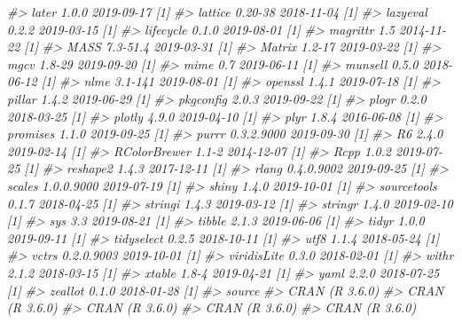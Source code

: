 \documentclass[
  12pt,
]{krantz}
\newenvironment{Shaded}{\begin{snugshade}}{\end{snugshade}}
\newcommand{\CommentTok}[1]{\textcolor[rgb]{0.56,0.35,0.01}{\textit{#1}}}
\begin{document}
\begin{Shaded}
\begin{Highlighting}[]
\CommentTok{#>  later          1.0.0      2019-09-17 [1]}
\CommentTok{#>  lattice        0.20-38    2018-11-04 [1]}
\CommentTok{#>  lazyeval       0.2.2      2019-03-15 [1]}
\CommentTok{#>  lifecycle      0.1.0      2019-08-01 [1]}
\CommentTok{#>  magrittr       1.5        2014-11-22 [1]}
\CommentTok{#>  MASS           7.3-51.4   2019-03-31 [1]}
\CommentTok{#>  Matrix         1.2-17     2019-03-22 [1]}
\CommentTok{#>  mgcv           1.8-29     2019-09-20 [1]}
\CommentTok{#>  mime           0.7        2019-06-11 [1]}
\CommentTok{#>  munsell        0.5.0      2018-06-12 [1]}
\CommentTok{#>  nlme           3.1-141    2019-08-01 [1]}
\CommentTok{#>  openssl        1.4.1      2019-07-18 [1]}
\CommentTok{#>  pillar         1.4.2      2019-06-29 [1]}
\CommentTok{#>  pkgconfig      2.0.3      2019-09-22 [1]}
\CommentTok{#>  plogr          0.2.0      2018-03-25 [1]}
\CommentTok{#>  plotly         4.9.0      2019-04-10 [1]}
\CommentTok{#>  plyr           1.8.4      2016-06-08 [1]}
\CommentTok{#>  promises       1.1.0      2019-09-25 [1]}
\CommentTok{#>  purrr          0.3.2.9000 2019-09-30 [1]}
\CommentTok{#>  R6             2.4.0      2019-02-14 [1]}
\CommentTok{#>  RColorBrewer   1.1-2      2014-12-07 [1]}
\CommentTok{#>  Rcpp           1.0.2      2019-07-25 [1]}
\CommentTok{#>  reshape2       1.4.3      2017-12-11 [1]}
\CommentTok{#>  rlang          0.4.0.9002 2019-09-25 [1]}
\CommentTok{#>  scales         1.0.0.9000 2019-07-19 [1]}
\CommentTok{#>  shiny          1.4.0      2019-10-01 [1]}
\CommentTok{#>  sourcetools    0.1.7      2018-04-25 [1]}
\CommentTok{#>  stringi        1.4.3      2019-03-12 [1]}
\CommentTok{#>  stringr        1.4.0      2019-02-10 [1]}
\CommentTok{#>  sys            3.3        2019-08-21 [1]}
\CommentTok{#>  tibble         2.1.3      2019-06-06 [1]}
\CommentTok{#>  tidyr          1.0.0      2019-09-11 [1]}
\CommentTok{#>  tidyselect     0.2.5      2018-10-11 [1]}
\CommentTok{#>  utf8           1.1.4      2018-05-24 [1]}
\CommentTok{#>  vctrs          0.2.0.9003 2019-10-01 [1]}
\CommentTok{#>  viridisLite    0.3.0      2018-02-01 [1]}
\CommentTok{#>  withr          2.1.2      2018-03-15 [1]}
\CommentTok{#>  xtable         1.8-4      2019-04-21 [1]}
\CommentTok{#>  yaml           2.2.0      2018-07-25 [1]}
\CommentTok{#>  zeallot        0.1.0      2018-01-28 [1]}
\CommentTok{#>  source                               }
\CommentTok{#>  CRAN (R 3.6.0)                       }
\CommentTok{#>  CRAN (R 3.6.0)                       }
\CommentTok{#>  CRAN (R 3.6.0)                       }
\CommentTok{#>  CRAN (R 3.6.0)                       }
\CommentTok{#>  CRAN (R 3.6.0)                       }

\end{Highlighting}
\end{Shaded}
\end{document}
